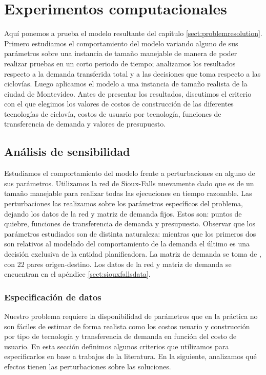 \chapter{Experimentos computacionales}
\label{sect:problemresults}

Aquí ponemos a prueba el modelo resultante del capitulo \ref{sect:problemresolution}. Primero estudiamos el comportamiento del modelo variando alguno de sus parámetros sobre una instancia de tamaño manejable de manera de poder realizar pruebas en un corto periodo de tiempo; analizamos los resultados respecto a la demanda transferida total y a las decisiones que toma respecto a las ciclovías. Luego aplicamos el modelo a una instancia de tamaño realista de la ciudad de Montevideo. Antes de presentar los resultados, discutimos el criterio con el que elegimos los valores de costos de construcción de las diferentes tecnologías de ciclovía, costos de usuario por tecnología, funciones de transferencia de demanda y valores de presupuesto.

\section{Análisis de sensibilidad}

Estudiamos el comportamiento del modelo frente a perturbaciones en alguno de sus parámetros. Utilizamos la red de Sioux-Falls nuevamente dado que es de un tamaño manejable para realizar todas las ejecuciones en tiempo razonable. Las perturbaciones las realizamos sobre los parámetros específicos del problema, dejando los datos de la red y matriz de demanda fijos. Estos son: puntos de quiebre, funciones de transferencia de demanda y presupuesto. Observar que los parámetros estudiados son de distinta naturaleza: mientras que los primeros dos son relativos al modelado del comportamiento de la demanda el último es una decisión exclusiva de la entidad planificadora. La matriz de demanda se toma de \cite{Liu2019}, con 22 pares origen-destino. Los datos de la red y matriz de demanda se encuentran en el apéndice \ref{sect:siouxfallsdata}.

\subsection{Especificación de datos}
\label{sect:dataspecification}

Nuestro problema requiere la disponibilidad de parámetros que en la práctica no son fáciles de estimar de forma realista como los costos usuario y construcción por tipo de tecnología y transferencia de demanda en función del costo de usuario. En esta sección definimos algunos criterios que utilizamos para especificarlos en base a trabajos de la literatura. En la siguiente, analizamos qué efectos tienen las perturbaciones sobre las soluciones.

